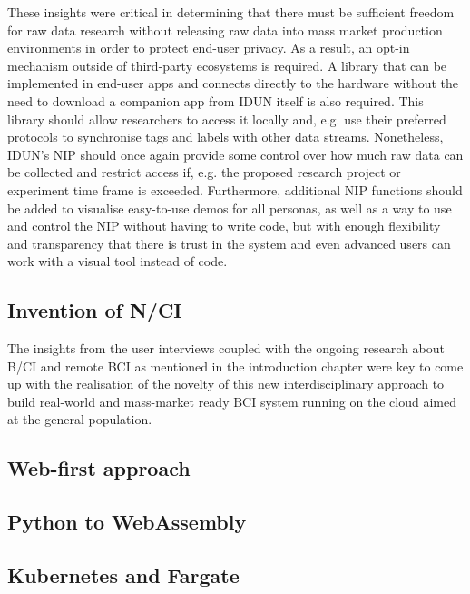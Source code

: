 These insights were critical in determining that there must be sufficient freedom for raw data research without releasing raw data into mass market production environments in order to protect end-user privacy. As a result, an opt-in mechanism outside of third-party ecosystems is required. A library that can be implemented in end-user apps and connects directly to the hardware without the need to download a companion app from IDUN itself is also required. This library should allow researchers to access it locally and, e.g. use their preferred protocols to synchronise tags and labels with other data streams. Nonetheless, IDUN's NIP should once again provide some control over how much raw data can be collected and restrict access if, e.g. the proposed research project or experiment time frame is exceeded. Furthermore, additional NIP functions should be added to visualise easy-to-use demos for all personas, as well as a way to use and control the NIP without having to write code, but with enough flexibility and transparency that there is trust in the system and even advanced users can work with a visual tool instead of code.

\subsection{Invention of N/CI}
\label{chapter4-invention-of-nci}

The insights from the user interviews coupled with the ongoing research about B/CI and remote BCI as mentioned in the introduction chapter were key to come up with the realisation of the novelty of this new interdisciplinary approach to build real-world and mass-market ready BCI system running on the cloud aimed at the general population.

\subsection{Web-first approach}
\label{chapter4-web-first-approach}

\subsection{Python to WebAssembly}
\label{chapter4-python-to-webassembly}

\subsection{Kubernetes and Fargate}
\label{chapter4-kubernetes-and-aws-fargate}

